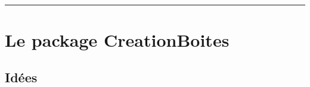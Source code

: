 \documentclass[french,11pt,a4paper]{article}
\begin{document}
\begin{tcolorbox}[colframe=lightgray,colback=white]
\begin{BoiteDeDemo}
	\lipsum[1][1]
\end{BoiteDeDemo}

\begin{BoiteDeDemo}[Compteur=false]
	\lipsum[1][1]
\end{BoiteDeDemo}

\begin{BoiteDeDemo}[Pluriel]
	\lipsum[1][1]
\end{BoiteDeDemo}

\begin{BoiteDeDemo}[SousTitre={Un petit sous-titre}]
	\lipsum[1][1]
\end{BoiteDeDemo}

\begin{BoiteDeDemo}[ComplementTitre={ - Un complément de titre}]%
	\lipsum[1][1]
\end{BoiteDeDemo}

\begin{BoiteDeDemo}[ModifLabel={ super important}]%
	\lipsum[1][1]
\end{BoiteDeDemo}

\begin{BoiteDeDemo}[Logo={example-image}]
	\lipsum[1][1]
\end{BoiteDeDemo}

\begin{BoiteDanger}[Compteur=false]
	\lipsum[1][1]
\end{BoiteDanger}
\end{tcolorbox}

\vfill~

\pagebreak


\hypertarget{matoc}{}

\tableofcontents

\vspace*{5mm}

\hrule

\vspace*{5mm}

\section{Le package CreationBoites}

\subsection{Idées}
\end{document}
